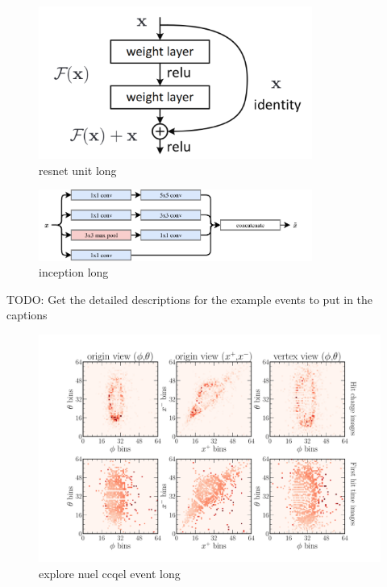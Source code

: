 \begin{figure} %
    \includegraphics[width=0.8\textwidth]{diagrams/7-cvn/resnet_unit.png}
    \caption[resnet unit short]
    {resnet unit long}
    \label{fig:resnet_unit}
\end{figure}

\begin{figure} %
    \includegraphics[width=0.8\textwidth]{diagrams/7-cvn/inception.pdf}
    \caption[inception short]
    {inception long}
    \label{fig:se}
\end{figure}

TODO: Get the detailed descriptions for the example events to put in the captions
\begin{figure} %
    \includegraphics[width=\textwidth]{diagrams/7-cvn/chipsnet/explore_nuel_ccqel_event.pdf}
    \caption[explore nuel ccqel event short]
    {explore nuel ccqel event long}
    \label{fig:explore_nuel_ccqel_event}
\end{figure}

